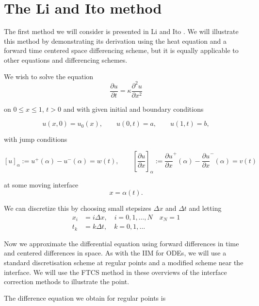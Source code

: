 \section{The Li and Ito method} \label{liIto}
The first method we will consider is presented in Li and Ito \cite{liito06}.
We will illustrate this method by demonstrating its derivation using the heat equation and a forward time centered space differencing scheme, but it is equally applicable to other equations and differencing schemes.

We wish to solve the equation
\begin{equation}
    \frac{\partial u}{\partial t} = \kappa \frac{\partial^2 u}{\partial x^2}
\end{equation}

on $0 \leq x \leq 1$, $t > 0$ and with given initial and boundary conditions

\begin{equation}
    u(x,0) = u_0(x), \qquad u(0,t) = a, \qquad u(1,t) = b,
\end{equation}

with jump conditions

\begin{equation}
    \left[u\right]_\alpha := u^+(\alpha) - u^-(\alpha) = w(t), \qquad
    \left[\frac{\partial u}{\partial x}\right]_\alpha := \frac{\partial u}{\partial x}^+(\alpha) - \frac{\partial u}{\partial x}^-(\alpha) = v(t)
\end{equation}

at some moving interface
\begin{equation}
    x = \alpha(t).
\end{equation}

We can discretize this by choosing small stepsizes $\Delta x$ and $\Delta t$ and letting
\begin{align}
    x_i &= i \Delta x, \quad i = 0, 1, \ldots, N \quad x_N = 1 \\
    t_k &= k \Delta t, \quad k = 0, 1, \ldots
\end{align}

Now we approximate the differential equation using forward differences in time and centered differences in space.
As with the IIM for ODEs, we will use a standard discretisation scheme at regular points and a modified scheme near the interface.
We will use the FTCS method in these overviews of the interface correction methods to illustrate the point.

The difference equation we obtain for regular points is

